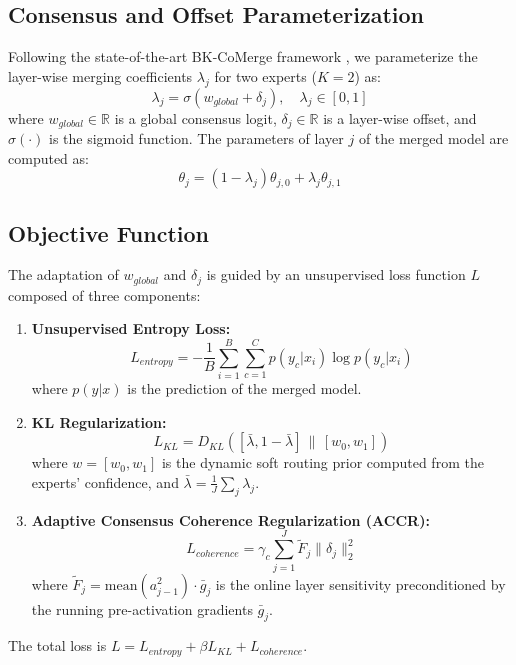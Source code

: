 \documentclass{article}
\theoremstyle{plain}
\theoremstyle{definition}
\theoremstyle{remark}
\begin{document}
\subsection{Consensus and Offset Parameterization}
Following the state-of-the-art BK-CoMerge framework \cite{bkcomerge2026}, we parameterize the layer-wise merging coefficients $\lambda_j$ for two experts ($K=2$) as:
\begin{equation}
    \lambda_j = \sigma(w_{global} + \delta_j), \quad \lambda_j \in [0, 1]
\end{equation}
where $w_{global} \in \mathbb{R}$ is a global consensus logit, $\delta_j \in \mathbb{R}$ is a layer-wise offset, and $\sigma(\cdot)$ is the sigmoid function. The parameters of layer $j$ of the merged model are computed as:
\begin{equation}
    \theta_j = (1 - \lambda_j)\theta_{j,0} + \lambda_j \theta_{j,1}
\end{equation}

\subsection{Objective Function}
The adaptation of $w_{global}$ and $\delta_j$ is guided by an unsupervised loss function $L$ composed of three components:
\begin{enumerate}
    \item \textbf{Unsupervised Entropy Loss:}
    \begin{equation}
        L_{entropy} = -\frac{1}{B} \sum_{i=1}^B \sum_{c=1}^C p(y_c | x_i) \log p(y_c | x_i)
    \end{equation}
    where $p(y | x)$ is the prediction of the merged model.
    \item \textbf{KL Regularization:}
    \begin{equation}
        L_{KL} = D_{KL}( [\bar{\lambda}, 1-\bar{\lambda}] \,\|\, [w_0, w_1] )
    \end{equation}
    where $w = [w_0, w_1]$ is the dynamic soft routing prior computed from the experts' confidence, and $\bar{\lambda} = \frac{1}{J}\sum_j \lambda_j$.
    \item \textbf{Adaptive Consensus Coherence Regularization (ACCR):}
    \begin{equation}
        L_{coherence} = \gamma_c \sum_{j=1}^J \tilde{F}_j \|\delta_j\|_2^2
    \end{equation}
    where $\tilde{F}_j = \text{mean}(a_{j-1}^2) \cdot \bar{g}_j$ is the online layer sensitivity preconditioned by the running pre-activation gradients $\bar{g}_j$.
\end{enumerate}
The total loss is $L = L_{entropy} + \beta L_{KL} + L_{coherence}$.
\end{document}
